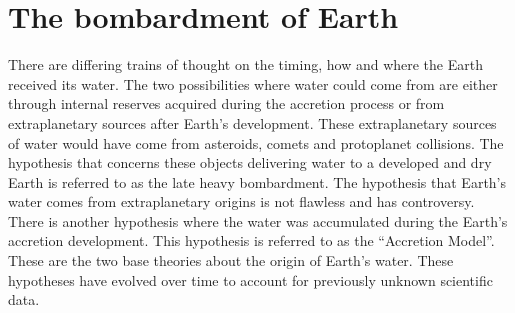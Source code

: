 
\section{\label{chap:bombardment}The bombardment of Earth}
There are differing trains of thought on the timing, how and where the Earth received its water. The two possibilities where water could come from are either through internal reserves acquired during the accretion process or from extraplanetary sources after Earth’s development. These extraplanetary sources of water would have come from asteroids, comets and protoplanet collisions. The hypothesis that concerns these objects delivering water to a developed and dry Earth is referred to as the late heavy bombardment. The hypothesis that Earth’s water comes from extraplanetary origins is not flawless and has controversy. There is another hypothesis where the water was accumulated during the Earth’s accretion development. This hypothesis is referred to as the “Accretion Model”. These are the two base theories about the origin of Earth’s water. These hypotheses have evolved over time to account for previously unknown scientific data.

